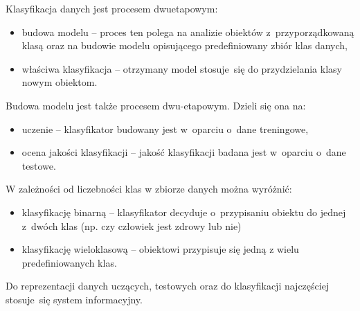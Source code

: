 Klasyfikacja danych jest procesem dwuetapowym:
\begin{itemize}
	\item budowa modelu – proces ten polega na analizie obiektów z przyporządkowaną klasą oraz na budowie modelu opisującego predefiniowany zbiór klas danych,
	\item właściwa klasyfikacja – otrzymany model stosuje się do przydzielania klasy nowym obiektom.
\end{itemize}
Budowa modelu jest także procesem dwu-etapowym. Dzieli się ona na:
\begin{itemize}
	\item uczenie – klasyfikator budowany jest w oparciu o dane treningowe,
	\item ocena jakości klasyfikacji – jakość klasyfikacji badana jest w oparciu o dane testowe.
\end{itemize}
W zależności od liczebności klas w zbiorze danych można wyróżnić:
\begin{itemize}
	\item klasyfikację binarną – klasyfikator decyduje o przypisaniu obiektu do jednej z dwóch klas (np. czy człowiek jest zdrowy lub nie)
	\item klasyfikację wieloklasową – obiektowi przypisuje się jedną z wielu predefiniowanych klas.
\end{itemize}
Do reprezentacji danych uczących, testowych oraz do klasyfikacji najczęściej stosuje się system informacyjny.
\begin{table}[h]
\begin{center}
	\caption{Przykład danych treningowych składających się z 5 atrybutów oraz klasy decyzyjnej. W ostatniej kolumnie znajduje się wynik klasyfikacji. W pięciu przypadkach, klasyfikator poprawnie wskazał klasę.}
	\label{system_informacyjny}
\end{center}
\end{table}

